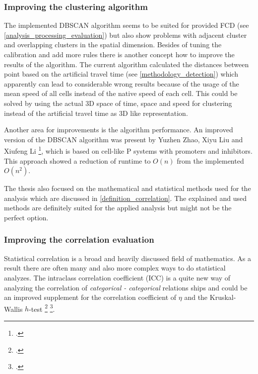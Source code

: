 \subsubsection{Improving the clustering algorithm}
The implemented DBSCAN algorithm seems to be suited for provided FCD (see \cref{analysis_processing_evaluation}) but also show problems with adjacent cluster and overlapping clusters in the spatial dimension. Besides of tuning the calibration and add more rules there is another concept how to improve the results of the algorithm. The current algorithm calculated the distances between point based on the artificial travel time (see \cref{methodology_detection}) which apparently can lead to considerable wrong results because of the usage of the mean speed of all cells instead of the native speed of each cell. This could be solved by using the actual 3D space of time, space and speed for clustering instead of the artificial travel time as 3D like representation.

Another area for improvements is the algorithm performance. An improved version of the DBSCAN algorithm was present by Yuzhen Zhao, Xiyu Liu and Xiufeng Li \footcite{https://journals.plos.org/plosone/article?id=10.1371/journal.pone.0200751}, which is based on cell-like P systems with promoters and inhibitors. This approach showed a reduction of runtime to $O(n)$ from the implemented $O(n^2)$.

\bigskip

The thesis also focused on the mathematical and statistical methods used for the analysis which are discussed in \cref{definition_correlation}. The explained and used methods are definitely suited for the applied analysis but might not be the perfect option.

\subsubsection{Improving the correlation evaluation}
Statistical correlation is a broad and heavily discussed field of mathematics. As a result there are often many and also more complex ways to do statistical analyzes. The intraclass correlation coefficient (ICC) is a quite new way of analyzing the correlation of \textit{categorical - categorical} relations ships and could be an improved supplement for the correlation coefficient of $\eta$ and the Kruskal-Wallis $h$-test \footcite{https://stats.stackexchange.com/questions/73065/correlation-coefficient-between-a-non-dichotomous-nominal-variable-and-a-numer} \footcite{https://pingouin-stats.org/generated/pingouin.intraclass_corr.html}.

